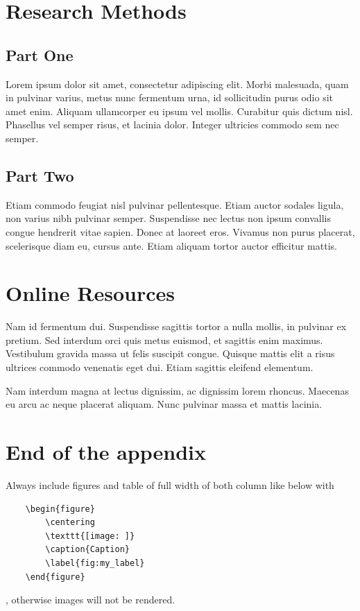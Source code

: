 \section{Research Methods}

\subsection{Part One}

Lorem ipsum dolor sit amet, consectetur adipiscing elit. Morbi
malesuada, quam in pulvinar varius, metus nunc fermentum urna, id
sollicitudin purus odio sit amet enim. Aliquam ullamcorper eu ipsum
vel mollis. Curabitur quis dictum nisl. Phasellus vel semper risus, et
lacinia dolor. Integer ultricies commodo sem nec semper.

\subsection{Part Two}

Etiam commodo feugiat nisl pulvinar pellentesque. Etiam auctor sodales
ligula, non varius nibh pulvinar semper. Suspendisse nec lectus non
ipsum convallis congue hendrerit vitae sapien. Donec at laoreet
eros. Vivamus non purus placerat, scelerisque diam eu, cursus
ante. Etiam aliquam tortor auctor efficitur mattis.

\section{Online Resources}

Nam id fermentum dui. Suspendisse sagittis tortor a nulla mollis, in
pulvinar ex pretium. Sed interdum orci quis metus euismod, et sagittis
enim maximus. Vestibulum gravida massa ut felis suscipit
congue. Quisque mattis elit a risus ultrices commodo venenatis eget
dui. Etiam sagittis eleifend elementum.

Nam interdum magna at lectus dignissim, ac dignissim lorem
rhoncus. Maecenas eu arcu ac neque placerat aliquam. Nunc pulvinar
massa et mattis lacinia.

\section{End of the appendix}
Always include figures and table of full width of both column like below with \begin{verbatim}
    \begin{figure}
        \centering
        \texttt{[image: ]}
        \caption{Caption}
        \label{fig:my_label}
    \end{figure}
\end{verbatim}, otherwise images will not be rendered.

